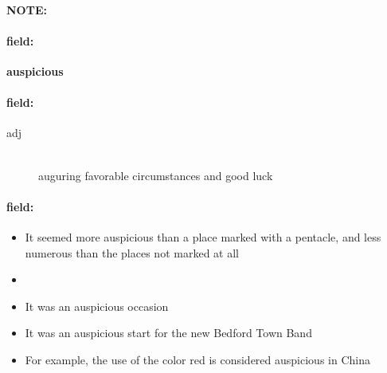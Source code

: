 \documentclass[12pt]{article}
\newenvironment{note}{\paragraph{NOTE:}}{}
\newenvironment{field}{\paragraph{field:}}{}
\begin{document}
\begin{note}
\begin{field}
\textbf{\large auspicious}
\end{field}


\begin{field}
\begin{description}
\item[adj] \hfill \\ 
auguring favorable circumstances and good luck

\end{description}
\end{field}

\begin{field}
\begin{itemize}
\item It seemed more auspicious than a place marked with a pentacle, and less numerous than the places not marked at all
\item 
\item It was an auspicious occasion
\item It was an auspicious start for the new Bedford Town Band
\item For example, the use of the color red is considered auspicious in China
\end{itemize}
\end{field}
\end{note}
\end{document}
